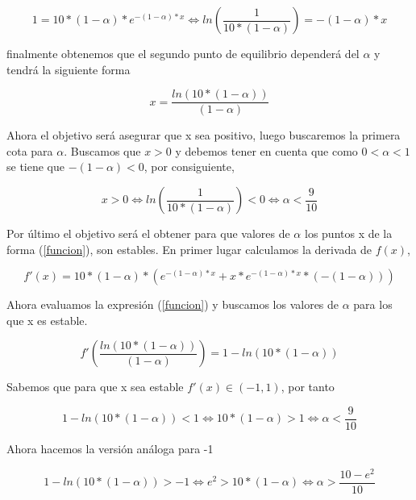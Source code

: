 \documentclass{article}
\begin{document}
\begin{equation}
1=10*(1-\alpha)*e^{-(1-\alpha)*x} \Longleftrightarrow ln(\frac{1}{10*(1-\alpha)}) = -(1-\alpha)*x
\end{equation}

finalmente obtenemos que el segundo punto de equilibrio dependerá del $\alpha$ y tendrá la siguiente forma 


\begin{equation}
x=\frac{ln(10*(1-\alpha))}{(1-\alpha)} \label{funcion}
\end{equation}

Ahora el objetivo será asegurar que x sea positivo, luego buscaremos la primera cota para $\alpha$. Buscamos que $x > 0$ y debemos tener en cuenta que como $0 < \alpha < 1$ se tiene que $-(1-\alpha) < 0$, por consiguiente,

\begin{equation}
x > 0 \Longleftrightarrow ln(\frac{1}{10*(1-\alpha)}) < 0 \Longleftrightarrow \alpha < \frac{9}{10}
\end{equation}

Por último el objetivo será el obtener para que valores de $\alpha$ los puntos x de la forma (\ref{funcion}), son estables. En primer lugar calculamos la derivada de $f(x)$,

\begin{equation}
f'(x)=10*(1-\alpha)*(e^{-(1-\alpha)*x}+x*e^{-(1-\alpha)*x}*(-(1-\alpha)))
\end{equation}

Ahora evaluamos la expresión (\ref{funcion}) y buscamos los valores de $\alpha$ para los que x es estable.

\begin{equation}
f'(\frac{ln(10*(1-\alpha))}{(1-\alpha)})=1-ln(10*(1-\alpha))
\end{equation}

Sabemos que para que x sea estable $f'(x) \in (-1,1)$,  por tanto

\begin{equation}
1-ln(10*(1-\alpha)) < 1 \Longleftrightarrow 10*(1-\alpha) > 1 \Longleftrightarrow \alpha < \frac{9}{10}
\end{equation}

Ahora hacemos la versión análoga para -1

\begin{equation}
1-ln(10*(1-\alpha)) > -1 \Longleftrightarrow e^2 > 10*(1-\alpha) \Longleftrightarrow \alpha > \frac{10-e^2}{10}
\end{equation}
\end{document}
